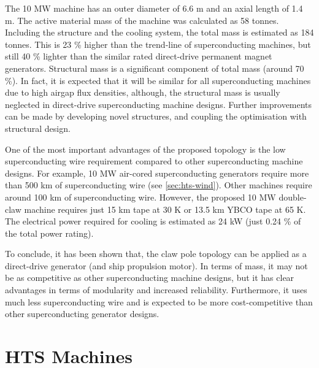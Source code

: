 \documentclass[final,peerreview,onecolumn]{IEEEtran}
\begin{document}
The 10 MW machine has an outer diameter of 6.6 m and an axial length of 1.4 m. The active material mass of the machine was calculated as 58 tonnes. Including the structure and the cooling system, the total mass is estimated as 184 tonnes. This is 23 \% higher than the trend-line of superconducting machines, but still 40 \% lighter than the similar rated direct-drive permanent magnet generators.
Structural mass is a significant component of total mass (around 70 \%). In fact, it is expected that it will be similar for all superconducting machines due to high airgap flux densities, although, the structural mass is usually neglected in direct-drive superconducting machine designs. Further improvements can be made by developing novel structures, and coupling the optimisation with structural design.

One of the most important advantages of the proposed topology is the low superconducting wire requirement compared to other superconducting machine designs. For example, 10 MW air-cored superconducting generators require more than 500 km of superconducting wire (see \autoref{sec:hts-wind}). Other machines require around 100 km of superconducting wire. However, the proposed 10 MW double-claw machine requires just 15 km  tape at 30 K or 13.5 km YBCO tape at 65 K. The electrical power required for cooling is estimated as 24 kW (just 0.24 \% of the total power rating). 


To conclude, it has been shown that, the claw pole topology can be applied as a direct-drive generator (and ship propulsion motor). In terms of mass, it may not be as competitive as other superconducting machine designs, but it has clear advantages in terms of modularity and increased reliability. Furthermore, it uses much less superconducting wire and is expected to be more cost-competitive than other superconducting generator designs.




\section{HTS Machines}
\end{document}
